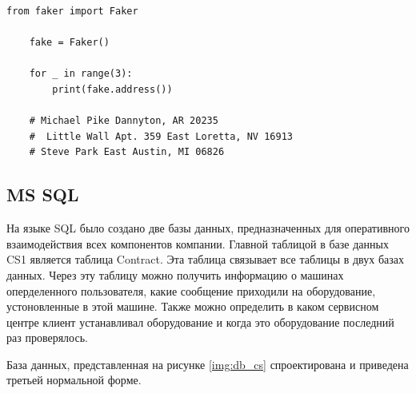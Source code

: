\begin{lstlisting}[caption=Генерация фейковых адресов, label = list:pythonFakerAddresses]
	from faker import Faker

	fake = Faker()

	for _ in range(3):
		print(fake.address())

	# Michael Pike Dannyton, AR 20235
	#  Little Wall Apt. 359 East Loretta, NV 16913
	# Steve Park East Austin, MI 06826

\end{lstlisting}


\newpage
\subsection{MS SQL}

\vspace{0.5cm}
\hspace{0.6cm}
На языке SQL было создано две базы данных, предназначенных для оперативного взаимодействия всех компонентов компании. Главной таблицой в базе данных CS1 является таблица Contract. Эта таблица связывает все таблицы в двух базах данных. Через эту таблицу можно получить информацию о машинах оперделенного пользователя, какие сообщение приходили на оборудование, устоновленные в этой машине. Также можно определить в каком сервисном центре клиент устанавливал оборудование и когда это оборудование последний раз проверялось.

\vspace{0.1cm}
База данных, представленная на рисунке \ref{img:db_cs} спроектирована и приведена третьей нормальной форме.

